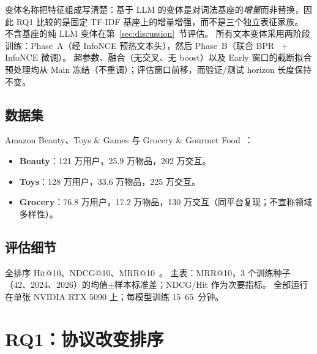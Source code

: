 \documentclass[sigconf,natbib=true,anonymous]{acmart}
\newcommand{\tfidf}{\textsc{TF-IDF}\xspace}
\begin{document}
变体名称把特征组成写清楚：基于 LLM 的变体是对词法基座的\emph{增量}而非替换，因此 RQ1 比较的是固定 \tfidf 基座上的增量增强，而不是三个独立表征家族。
不含基座的纯 LLM 变体在第~\ref{sec:discussion}~节评估。
所有文本变体采用两阶段训练：Phase~A（经 InfoNCE 预热文本头），然后 Phase~B（联合 BPR~\cite{rendle2009bpr} + InfoNCE 微调）。
超参数、融合（无交叉、无 boost）以及 Early 窗口的截断拟合预处理均从 Main 冻结（不重调）；评估窗口前移，而验证/测试 horizon 长度保持不变。

\subsection{数据集}

Amazon Beauty、Toys \& Games 与 Grocery \& Gourmet Food~\cite{mcauley2015amazon,ni2019amazon}：
\begin{itemize}[leftmargin=*,itemsep=1pt]
\item \textbf{Beauty}：121 万用户，25.9 万物品，202 万交互。
\item \textbf{Toys}：128 万用户，33.6 万物品，225 万交互。
\item \textbf{Grocery}：76.8 万用户，17.2 万物品，130 万交互（同平台复现；不宣称领域多样性）。
\end{itemize}

\subsection{评估细节}

全排序 Hit@10、NDCG@10、MRR@10~\cite{krichene2020sampledmetrics}。
主表：MRR@10，3 个训练种子（42、2024、2026）的均值$\pm$样本标准差；NDCG/Hit 作为次要指标。
全部运行在单张 NVIDIA RTX 5090 上；每模型训练 15--65~分钟。

\section{RQ1：协议改变排序}
\label{sec:rq1}
\end{document}

